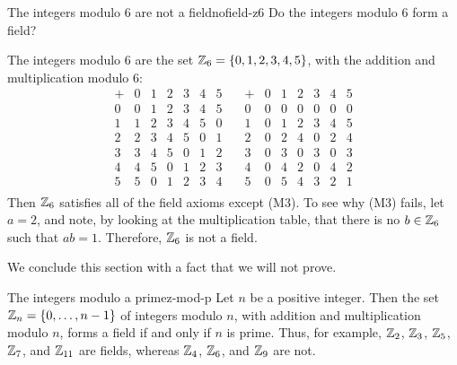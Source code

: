 \begin{example}{The integers modulo 6 are not a field}{nofield-z6}
  Do the integers modulo 6 form a field? 
\end{example}

\begin{solution}
  The integers modulo 6 are the set $\mathbb{Z}_6=\left\{0,1,2,3,4,5\right\}$, with the
  addition and multiplication modulo 6:
    \[ \begin{array}{l|llllll}
    +&0&1&2&3&4&5 \\\hline
    0&0&1&2&3&4&5 \\
    1&1&2&3&4&5&0 \\
    2&2&3&4&5&0&1 \\
    3&3&4&5&0&1&2 \\
    4&4&5&0&1&2&3 \\
    5&5&0&1&2&3&4 \\
  \end{array}
  \quad
  \begin{array}{l|llllll}
    +&0&1&2&3&4&5 \\\hline
    0&0&0&0&0&0&0 \\
    1&0&1&2&3&4&5 \\
    2&0&2&4&0&2&4 \\
    3&0&3&0&3&0&3 \\
    4&0&4&2&0&4&2 \\
    5&0&5&4&3&2&1 \\
  \end{array}
  \]
  Then $\mathbb{Z}_6$ satisfies all of the field axioms except
  (M3). To see why (M3) fails, let $a=2$, and note, by looking at the
  multiplication table, that there is no $b\in\mathbb{Z}_6$ such that
  $ab=1$. Therefore, $\mathbb{Z}_6$ is not a field.
\end{solution}

We conclude this section with a fact that we will not prove.

\begin{theorem}{The integers modulo a prime}{z-mod-p}
  Let $n$ be a positive integer. Then the set
  $\mathbb{Z}_n=\left\{0,\ldots,n-1\right\}$ of integers modulo $n$, with
  addition and multiplication modulo $n$, forms a field if and only if
  $n$ is prime. Thus, for example, $\mathbb{Z}_2$, $\mathbb{Z}_3$,
  $\mathbb{Z}_5$, $\mathbb{Z}_7$, and $\mathbb{Z}_{11}$ are fields,
  whereas $\mathbb{Z}_4$, $\mathbb{Z}_6$, and $\mathbb{Z}_9$ are not.
\end{theorem}
